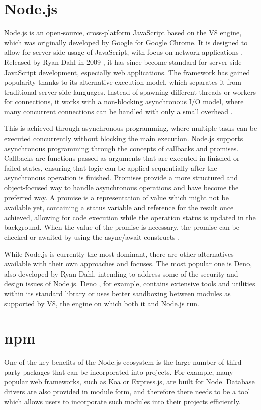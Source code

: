 \section*{Node.js}
Node.js is an open-source, cross-platform JavaScript based on the V8 engine,
which was originally developed by Google for Google Chrome. It is designed to
allow for server-side usage of JavaScript, with focus on network applications
\cite{node-about}. Released by Ryan Dahl in 2009 \cite{ryan-node}, it has since
become standard for server-side JavaScript development, especially web
applications. The framework has gained popularity thanks to its alternative
execution model, which separates it from traditional server-side languages.
Instead of spawning different threads or workers for connections, it works with
a non-blocking asynchronous I/O model, where many concurrent connections can be
handled with only a small overhead \cite{orsini_2013}.

This is achieved through asynchronous programming, where multiple tasks can be
executed concurrently without blocking the main execution. Node.js supports
asynchronous programming through the concepts of callbacks and promises.
Callbacks are functions passed as arguments that are executed in finished or
failed states, ensuring that logic can be applied sequentially after the
asynchronous operation is finished. Promises provide a more structured and
object-focused way to handle asynchronous operations and have become the
preferred way. A promise is a representation of value which might not be
available yet, containing a status variable and reference for the result once
achieved, allowing for code execution while the operation status is updated in
the background. When the value of the promise is necessary, the promise can be
checked or awaited by using the async/await constructs
\cite{PromiseJavaScriptMDN_2023}.

While Node.js is currently the most dominant, there are other alternatives
available with their own approaches and focuses. The most popular one is Deno,
also developed by Ryan Dahl, intending to address some of the security and
design issues of Node.js. Deno \cite{Deno}, for example, contains extensive
tools and utilities within its standard library or uses better sandboxing
between modules as supported by V8, the engine on which both it and Node.js run.


\section*{npm}
One of the key benefits of the Node.js ecosystem is the large number of
third-party packages that can be incorporated into projects. For example, many
popular web frameworks, such as Koa or Express.js, are built for Node. Database
drivers are also provided in module form, and therefore there needs to be a tool
which allows users to incorporate such modules into their projects efficiently. 

